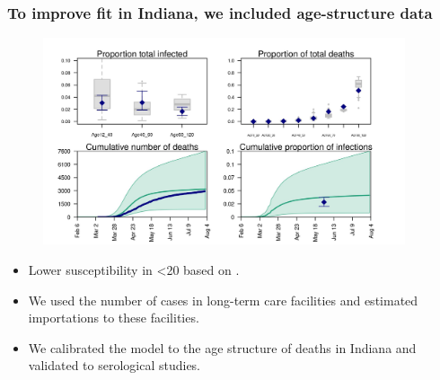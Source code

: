 \documentclass[usenames,dvipsnames]{beamer}
\begin{document}
\begin{frame}
  \frametitle{To improve fit in Indiana, we included age-structure data}
    \begin{figure}
    \includegraphics[width=0.95\textwidth]{./figures/manuscript_figure_age_deaths.jpeg}
  \end{figure}
  \begin{itemize}
  \item Lower susceptibility in <20 based on \citep{Davies2020_NatMed}. 
  \item We used the number of cases in long-term care facilities and estimated importations to these facilities.
  \item We calibrated the model to the age structure of deaths in Indiana and validated to serological studies.
  \end{itemize}
  
\end{frame}
\end{document}
